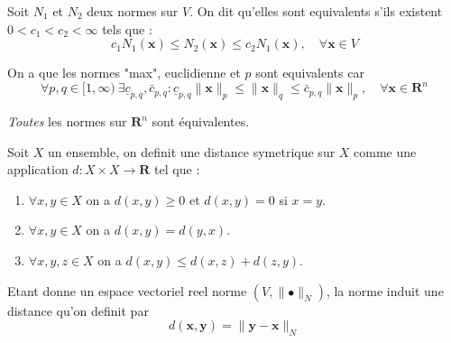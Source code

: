 \begin{definition}
Soit  $N_{1}$ et $N_{2}$ deux normes sur $V$. On dit qu'elles sont equivalents s'ils existent $0<c_{1}<c_{2}<\infty$ tels que :
$$
c_{1}N_{1}(\boldsymbol{x})\le N_{2}(\boldsymbol{x})\leq c_{2}N_{1}(\boldsymbol{x}),\quad\forall \boldsymbol{x}\in V
$$\end{definition}
\begin{remark}
On a que les normes "max", euclidienne et $p$ sont equivalents car 
$$
\forall p,q\in [1,\infty)~\exists  \underline{c}_{p,q}, \bar{c}_{p,q}: \underline{c}_{p,q}\lVert \boldsymbol{x} \rVert _{p}\le\lVert \boldsymbol{x} \rVert _{q}\le \bar{c}_{p,q}\lVert \boldsymbol{x} \rVert _{p},\quad\forall \boldsymbol{x}\in \mathbf{R}^{n}
$$
\end{remark}
\begin{proposition}
\emph{Toutes} les normes sur $\mathbf{R}^{n}$ sont équivalentes.
\end{proposition}

\begin{definition}[Distance]
Soit $X$ un ensemble, on definit une distance symetrique sur $X$ comme une application $d:X\times X \to\mathbf{R}$ tel que :
\begin{enumerate}
\item $\forall x,y\in X$ on a $d(x,y)\ge0$ et $d(x,y)=0$ si $x=y$.
\item $\forall x,y\in X$ on a $d(x,y)=d(y,x)$.
\item $\forall x,y,z\in X$ on a $d(x,y)\le d(x,z)+d(z,y)$.
\end{enumerate}
\end{definition}

Etant donne un espace vectoriel reel norme $(V,\lVert \bullet \rVert_{N})$, la norme induit une distance qu'on definit par 
$$
d(\boldsymbol{x},\boldsymbol{y})=\lVert \boldsymbol{y}-\boldsymbol{x} \rVert _{N}
$$

